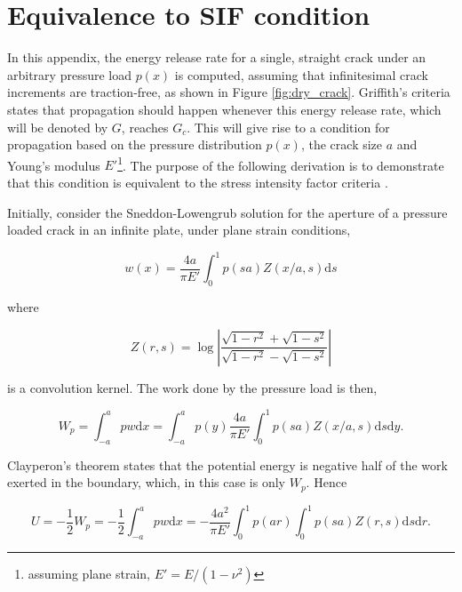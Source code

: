 \section{Equivalence to SIF condition}\label{SIF_equivalence}

In this appendix, the energy release rate for a single, straight crack under an arbitrary pressure load $p(x)$ is computed, assuming that infinitesimal crack increments are traction-free, as shown in Figure \ref{fig:dry_crack}. Griffith's criteria states that propagation should happen whenever this energy release rate, which will be denoted by $G$, reaches $G_c$. This will give rise to a condition for propagation based on the pressure distribution $p(x)$, the crack size $a$ and Young's modulus $E'$\footnote{assuming plane strain, $E'=E/(1-\nu^2)$}. The purpose of the following derivation is to demonstrate that this condition is equivalent to the stress intensity factor criteria \cite{irwin1957analysis}.

Initially, consider the Sneddon-Lowengrub solution for the aperture of a pressure loaded crack in an infinite plate, under plane strain conditions,

\begin{equation}
    w(x) = \dfrac{4a}{\pi E'}\int^1_0p(sa)Z(x/a, s)\text{d}s
\end{equation}

\noindent where

\begin{equation}
    Z(r,s) = \log\left|\dfrac{\sqrt{1-r^2}+\sqrt{1-s^2}}{\sqrt{1-r^2}-\sqrt{1-s^2}}\right|
\end{equation}

\noindent is a convolution kernel. The work done by the pressure load is then,

\begin{equation}
    W_p = \int_{-a}^a p w \text{d}x = \int_{-a}^a p(y) \dfrac{4a}{\pi E'}\int^1_0p(sa)Z(x/a, s)\text{d}s\text{d}y.
\end{equation}

\noindent Clayperon's theorem \cite{fosdick2003} states that the potential energy is negative half of the work exerted in the boundary, which, in this case is only $W_p$. Hence

\begin{equation}
    U = -\dfrac{1}{2}W_p = -\dfrac{1}{2}\int_{-a}^a p w \text{d}x = -\dfrac{4a^2}{\pi E'}\int_{0}^1 p(ar)\int^1_0p(sa)Z(r, s)\text{d}s\text{d}r.
\end{equation}


